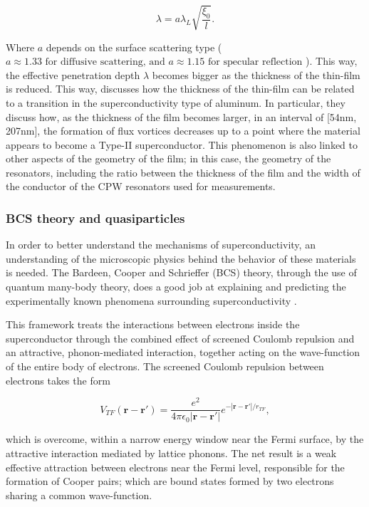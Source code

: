 \documentclass[12pt, a4paper]{article}
\begin{document}
\begin{equation}
    \label{LondonDepth}
    \lambda = a \lambda_L \sqrt{\frac{\xi_0}{l}}.
\end{equation}

Where $a$ depends on the surface scattering type ($a \approx 1.33 \text{ for diffusive scattering, and } a \approx 1.15 \text{ for specular reflection}$ \cite{Tinkham1996}). This way, the effective penetration depth $\lambda$ becomes bigger as the thickness of the thin-film is reduced. This way, \cite{Lopez-Nunez2025} discusses how the thickness of the thin-film can be related to a transition in the superconductivity type of aluminum. In particular, they discuss how, as the thickness of the film becomes larger, in an interval of [54nm, 207nm], the formation of flux vortices decreases up to a point where the material appears to become a Type-II superconductor. This phenomenon is also linked to other aspects of the geometry of the film; in this case, the geometry of the resonators, including the ratio between the thickness of the film and the width of the conductor of the CPW resonators used for measurements. 

\subsubsection{BCS theory and quasiparticles}

In order to better understand the mechanisms of superconductivity, an understanding of the microscopic physics behind the behavior of these materials is needed. The Bardeen, Cooper and Schrieffer (BCS) theory, through the use of quantum many-body theory, does a good job at explaining and predicting the experimentally known phenomena surrounding superconductivity \cite{Annett2003}.

This framework treats the interactions between electrons inside the superconductor through the combined effect of screened Coulomb repulsion and an attractive, phonon-mediated interaction, together acting on the wave-function of the entire body of electrons. The screened Coulomb repulsion between electrons takes the form

\begin{equation}
    \label{CooperPotential}
    V_{TF}(\mathbf{r}-\mathbf{r'}) = \frac{e^2}{4 \pi \epsilon_0 |\mathbf{r}-\mathbf{r'}|} e^{-|\mathbf{r}-\mathbf{r'}| / r_{TF}},
\end{equation}

which is overcome, within a narrow energy window near the Fermi surface, by the attractive interaction mediated by lattice phonons. The net result is a weak effective attraction between electrons near the Fermi level, responsible for the formation of Cooper pairs; which are bound states formed by two electrons sharing a common wave-function.
\end{document}
